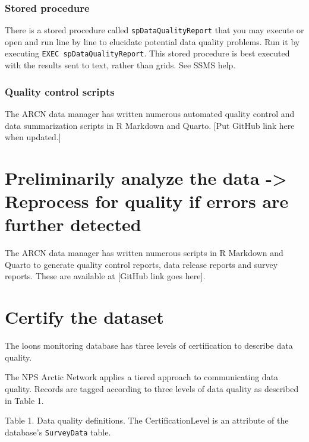 \documentclass[
  letterpaper,
  DIV=11,
  numbers=noendperiod]{scrreprt}
\begin{document}
\subsubsection{Stored procedure}\label{stored-procedure}

There is a stored procedure called \texttt{spDataQualityReport} that you
may execute or open and run line by line to elucidate potential data
quality problems. Run it by executing
\texttt{EXEC\ spDataQualityReport}. This stored procedure is best
executed with the results sent to text, rather than grids. See SSMS
help.

\subsubsection{Quality control scripts}\label{quality-control-scripts}

The ARCN data manager has written numerous automated quality control and
data summarization scripts in R Markdown and Quarto. {[}Put GitHub link
here when updated.{]}

\section{Preliminarily analyze the data -\textgreater{} Reprocess for
quality if errors are further
detected}\label{preliminarily-analyze-the-data---reprocess-for-quality-if-errors-are-further-detected}

The ARCN data manager has written numerous scripts in R Markdown and
Quarto to generate quality control reports, data release reports and
survey reports. These are available at {[}GitHub link goes here{]}.

\section{Certify the dataset}\label{certify-the-dataset}

The loons monitoring database has three levels of certification to
describe data quality.

The NPS Arctic Network applies a tiered approach to communicating data
quality. Records are tagged according to three levels of data quality as
described in Table 1.

Table 1. Data quality definitions. The CertificationLevel is an
attribute of the database's \texttt{SurveyData} table.
\end{document}
